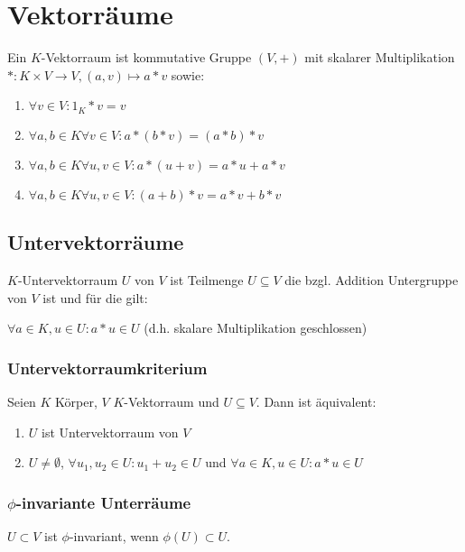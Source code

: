 \section*{Vektorräume}

Ein $K$-Vektorraum ist kommutative Gruppe $(V, +)$ mit skalarer Multiplikation $* : K \times V \rightarrow V, (a, v) \mapsto a * v$ sowie:

\begin{enumerate}[label=(\alph*)]
	\item $\forall v \in V : 1_K * v = v$
	\item $\forall a, b \in K \forall v \in V : a*(b*v)=(a*b)*v$
	\item $\forall a, b \in K \forall u, v \in V : a*(u+v)=a*u+a*v$
	\item $\forall a, b \in K \forall u, v \in V : (a+b)*v=a*v+b*v$
\end{enumerate}

\subsection*{Untervektorräume}

$K$-Untervektorraum $U$ von $V$ ist Teilmenge $U \subseteq V$ die bzgl. Addition Untergruppe von $V$ ist und für die gilt:

$\forall a \in K, u \in U : a*u \in U$ (d.h. skalare Multiplikation geschlossen)

\subsubsection*{Untervektorraumkriterium}

Seien $K$ Körper, $V$ $K$-Vektorraum und $U \subseteq V$. Dann ist äquivalent:

\begin{enumerate}[label=(\alph*)]
	\item $U$ ist Untervektorraum von $V$
	\item $U \neq \emptyset$, $\forall u_1, u_2 \in U : u_1 + u_2 \in U$ und $\forall a \in K, u \in U : a*u \in U$
\end{enumerate}

\subsubsection*{$\phi$-invariante Unterräume}

$U \subset V$ ist $\phi$-invariant, wenn $\phi(U) \subset U$.

